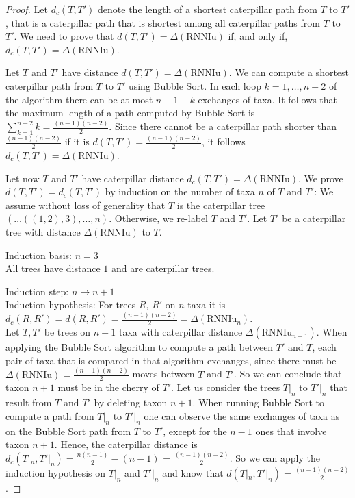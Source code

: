 \documentclass[11pt, a4paper]{article}
\newcommand{\rnniu}{\mathrm{RNNIu}}
\begin{document}

\begin{proof}
    Let $d_c(T,T')$ denote the length of a shortest caterpillar path from $T$ to $T'$, that is a caterpillar path that is shortest among all caterpillar paths from $T$ to $T'$.
    We need to prove that $d(T,T') = \Delta(\rnniu)$ if, and only if, $d_c(T,T') = \Delta(\rnniu)$.

    Let $T$ and $T'$ have distance $d(T,T') = \Delta(\rnniu)$.
    We can compute a  shortest caterpillar path from $T$ to $T'$ using Bubble Sort.
    In each loop $k=1, \ldots, n-2$ of the algorithm there can be at most $n-1-k$ exchanges of taxa.
    It follows that the maximum length of a path computed by Bubble Sort is $\sum\limits_{k=1}^{n-2} k = \frac{(n-1)(n-2)}{2}$.
    Since there cannot be a caterpillar path shorter than $\frac{(n-1)(n-2)}{2}$ if it is $d(T,T') = \frac{(n-1)(n-2)}{2}$, it follows $d_c(T,T') = \Delta(\rnniu)$.

    Let now $T$ and $T'$ have caterpillar distance $d_c(T,T') = \Delta(\rnniu)$.
    We prove $d(T,T') = d_c(T,T')$ by induction on the number of taxa $n$ of $T$ and $T'$:
    We assume without loss of generality that $T$ is the caterpillar tree $(\ldots ((1,2),3), \ldots, n)$.
    Otherwise, we re-label $T$ and $T'$.
    Let $T'$ be a caterpillar tree with distance $\Delta(\rnniu)$ to $T$.

    Induction basis: $n=3$\\
    All trees have distance $1$ and are caterpillar trees.

    Induction step: $n \to n+1$\\
    Induction hypothesis: For trees $R$, $R'$ on $n$ taxa it is $d_c(R,R') = d(R, R') = \frac{(n-1)(n-2)}{2} = \Delta(\rnniu_n)$.\\
    Let $T, T'$ be trees on $n+1$ taxa with caterpillar distance $\Delta(\rnniu_{n+1})$.
    When applying the Bubble Sort algorithm to compute a path between $T'$ and $T$, each pair of taxa that is compared in that algorithm exchanges, since there must be $\Delta(\rnniu)=\frac{(n-1)(n-2)}{2}$ moves between $T$ and $T'$.
    So we can conclude that taxon $n+1$ must be in the cherry of $T'$.
    Let us consider the trees $T|_n$ to $T'|_n$ that result from $T$ and $T'$ by deleting taxon $n+1$.
    When running Bubble Sort to compute a path from $T|_n$ to $T'|_n$ one can observe the same exchanges of taxa as on the Bubble Sort path from $T$ to $T'$, except for the $n-1$ ones that involve taxon $n+1$.
    Hence, the caterpillar distance is $d_c(T|_n, T'|_n) = \frac{n(n-1)}{2} - (n-1)$ = $\frac{(n-1)(n-2)}{2}$.
    So we can apply the induction hypothesis on $T|_n$ and $T'|_n$ and know that $d(T|_n,T'|_n) = \frac{(n-1)(n-2)}{2}$.


\end{proof}
\end{document}
